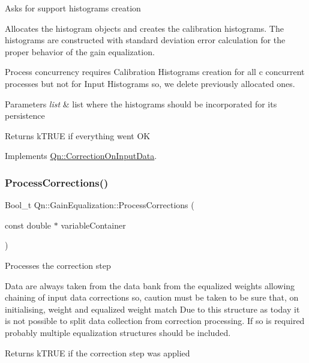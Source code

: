 Asks for support histograms creation

Allocates the histogram objects and creates the calibration histograms. The histograms are constructed with standard deviation error calculation for the proper behavior of the gain equalization.

Process concurrency requires Calibration Histograms creation for all c concurrent processes but not for Input Histograms so, we delete previously allocated ones. 
\begin{DoxyParams}{Parameters}
{\em list} & list where the histograms should be incorporated for its persistence \\
\hline
\end{DoxyParams}
\begin{DoxyReturn}{Returns}
k\+T\+R\+UE if everything went OK 
\end{DoxyReturn}


Implements \mbox{\hyperlink{classQn_1_1CorrectionOnInputData_a1556dd574545ef77d6b462020101bf39}{Qn\+::\+Correction\+On\+Input\+Data}}.

\mbox{\label{classQn_1_1GainEqualization_ade22bc9b3aee596b6594d8a8d6fdc1f1}} 
\subsubsection{\texorpdfstring{Process\+Corrections()}{ProcessCorrections()}}
{\footnotesize\ttfamily Bool\+\_\+t Qn\+::\+Gain\+Equalization\+::\+Process\+Corrections (\begin{DoxyParamCaption}\item[{const double $\ast$}]{variable\+Container }\end{DoxyParamCaption})\hspace{0.3cm}{\ttfamily [virtual]}}

Processes the correction step

Data are always taken from the data bank from the equalized weights allowing chaining of input data corrections so, caution must be taken to be sure that, on initialising, weight and equalized weight match Due to this structure as today it is not possible to split data collection from correction processing. If so is required probably multiple equalization structures should be included. \begin{DoxyReturn}{Returns}
k\+T\+R\+UE if the correction step was applied 
\end{DoxyReturn}


